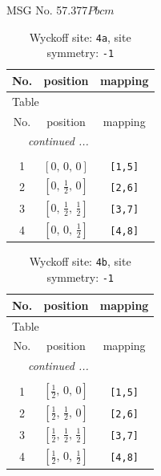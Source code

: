 \documentclass[fleqn,8pt]{jsarticle}
\begin{document}
\setcounter{MaxMatrixCols}{32}

\renewcommand{\tablename}{Table~}
\renewcommand{\figurename}{Figure~}
\begin{center}
\LARGE
MSG No. 57.377\quad$Pbcm$
\end{center}
\renewcommand{\arraystretch}{1.2}
\begin{longtable}{ccc}
\caption{Wyckoff site: {\tt 4a}, site symmetry: {\tt -1}}
 \\
 \hline \hline
No. & position & mapping \\ \hline \endfirsthead

\multicolumn{2}{l}{\tablename\ \thetable{}} \\
 \hline \hline
No. & position & mapping \\ \hline \endhead

 \hline \hline
\multicolumn{2}{r}{\footnotesize\it continued ...} \\ \endfoot

 \hline \hline
\multicolumn{2}{r}{} \\ \endlastfoot

1 & $\left[ 0,\, 0,\, 0 \right]$ & {\tt [1,5]} \\ \hline
2 & $\left[ 0,\, \frac{1}{2},\, 0 \right]$ & {\tt [2,6]} \\ \hline
3 & $\left[ 0,\, \frac{1}{2},\, \frac{1}{2} \right]$ & {\tt [3,7]} \\ \hline
4 & $\left[ 0,\, 0,\, \frac{1}{2} \right]$ & {\tt [4,8]} \\
\end{longtable}
\renewcommand{\arraystretch}{1.2}
\begin{longtable}{ccc}
\caption{Wyckoff site: {\tt 4b}, site symmetry: {\tt -1}}
 \\
 \hline \hline
No. & position & mapping \\ \hline \endfirsthead

\multicolumn{2}{l}{\tablename\ \thetable{}} \\
 \hline \hline
No. & position & mapping \\ \hline \endhead

 \hline \hline
\multicolumn{2}{r}{\footnotesize\it continued ...} \\ \endfoot

 \hline \hline
\multicolumn{2}{r}{} \\ \endlastfoot

1 & $\left[ \frac{1}{2},\, 0,\, 0 \right]$ & {\tt [1,5]} \\ \hline
2 & $\left[ \frac{1}{2},\, \frac{1}{2},\, 0 \right]$ & {\tt [2,6]} \\ \hline
3 & $\left[ \frac{1}{2},\, \frac{1}{2},\, \frac{1}{2} \right]$ & {\tt [3,7]} \\ \hline
4 & $\left[ \frac{1}{2},\, 0,\, \frac{1}{2} \right]$ & {\tt [4,8]} \\
\end{longtable}
\end{document}
